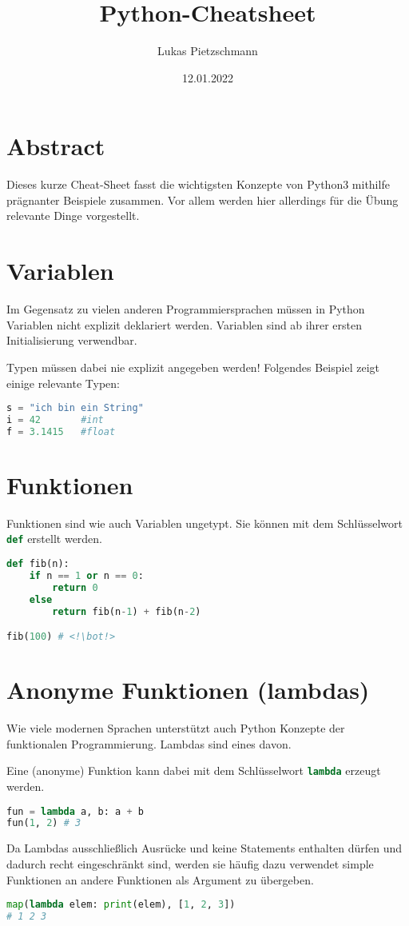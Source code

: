 \documentclass[columns=3]{cheatsheet}
\title{Python-Cheatsheet}
\author{Lukas Pietzschmann}
\date{12.01.2022}
\begin{document}
\maketitle

\section{Abstract}
Dieses kurze Cheat-Sheet fasst die wichtigsten Konzepte von Python3 mithilfe
prägnanter Beispiele zusammen. Vor allem werden hier allerdings für die Übung relevante Dinge vorgestellt.

\section{Variablen}
Im Gegensatz zu vielen anderen Programmiersprachen müssen in Python Variablen nicht explizit deklariert
werden. Variablen sind ab ihrer ersten Initialisierung verwendbar.\par
Typen müssen dabei nie explizit angegeben werden! Folgendes Beispiel zeigt einige relevante Typen:
\begin{lstlisting}[language=python]
s = "ich bin ein String"
i = 42       #int
f = 3.1415   #float
\end{lstlisting}

\section{Funktionen}
Funktionen sind wie auch Variablen ungetypt. Sie können mit dem Schlüsselwort \lstinline[language=python]{def}
erstellt werden.
\begin{lstlisting}[language=python]
def fib(n):
	if n == 1 or n == 0:
		return 0
	else
		return fib(n-1) + fib(n-2)

fib(100) # <!\bot!>
\end{lstlisting}

\section{Anonyme Funktionen (lambdas)}
Wie viele modernen Sprachen unterstützt auch Python Konzepte der funktionalen Programmierung. Lambdas sind eines davon.\par
Eine (anonyme) Funktion kann dabei mit dem Schlüsselwort \lstinline[language=python]{lambda} erzeugt werden.
\begin{lstlisting}[language=python]
fun = lambda a, b: a + b
fun(1, 2) # 3
\end{lstlisting}
Da Lambdas ausschließlich Ausrücke und keine Statements enthalten dürfen und dadurch recht eingeschränkt sind, werden sie häufig
dazu verwendet simple Funktionen an andere Funktionen als Argument zu übergeben.
\begin{lstlisting}[language=python]
map(lambda elem: print(elem), [1, 2, 3])
# 1 2 3
\end{lstlisting}
\end{document}
